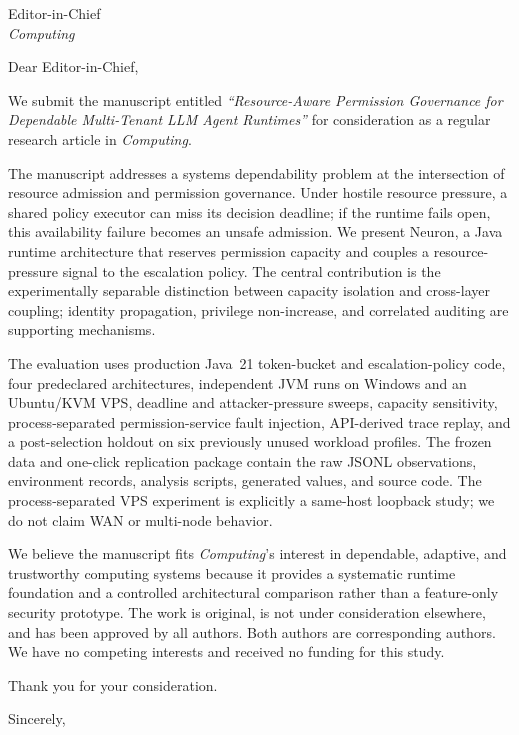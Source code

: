 \documentclass[11pt]{letter}
\date{10 August 2026}
\begin{document}
\begin{letter}{Editor-in-Chief\\\emph{Computing}}

\opening{Dear Editor-in-Chief,}

We submit the manuscript entitled
\emph{``Resource-Aware Permission Governance for Dependable Multi-Tenant LLM
Agent Runtimes''} for consideration as a regular research article in
\emph{Computing}.

The manuscript addresses a systems dependability problem at the intersection
of resource admission and permission governance. Under hostile resource
pressure, a shared policy executor can miss its decision deadline; if the
runtime fails open, this availability failure becomes an unsafe admission. We
present Neuron, a Java runtime architecture that reserves permission
capacity and couples a resource-pressure signal to the escalation policy.
The central contribution is the experimentally separable distinction between
capacity isolation and cross-layer coupling; identity propagation,
privilege non-increase, and correlated auditing are supporting mechanisms.

The evaluation uses production Java~21 token-bucket and escalation-policy
code, four predeclared architectures, independent JVM runs on Windows and an
Ubuntu/KVM VPS, deadline and attacker-pressure sweeps, capacity sensitivity,
process-separated permission-service fault injection, API-derived trace
replay, and a post-selection holdout on six previously unused workload
profiles. The frozen data and one-click replication package contain the raw
JSONL observations, environment records, analysis scripts, generated values,
and source code. The process-separated VPS experiment is explicitly a
same-host loopback study; we do not claim WAN or multi-node behavior.

We believe the manuscript fits \emph{Computing}'s interest in dependable,
adaptive, and trustworthy computing systems because it provides a systematic
runtime foundation and a controlled architectural comparison rather than a
feature-only security prototype. The work is original, is not under
consideration elsewhere, and has been approved by all authors. Both authors
are corresponding authors. We have no competing interests and received no
funding for this study.

Thank you for your consideration.

\closing{Sincerely,}

\end{letter}
\end{document}
